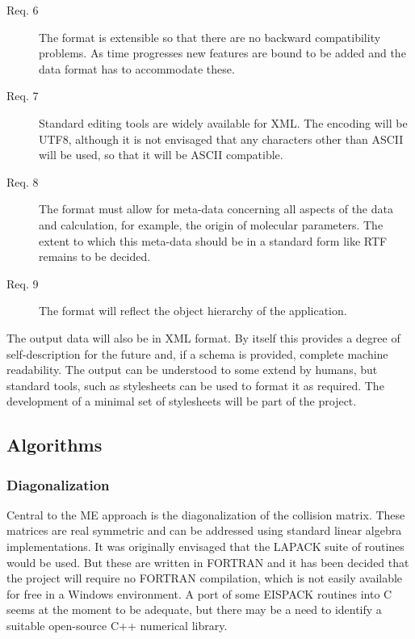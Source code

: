 \begin{description}
\item[Req. 6]{The format is extensible so that there are no backward compatibility problems. As time progresses new features are bound to be added and the data format has to accommodate these.}
\item[Req. 7]{Standard editing tools are widely available for XML. The encoding will be UTF8, although it is not envisaged that any characters other than ASCII will be used, so that it will be ASCII compatible.}
\item[Req. 8]{The format must allow for meta-data concerning all aspects of the data and calculation, for example, the origin of molecular parameters. The extent to which this meta-data should be in a standard form like RTF remains to be decided.}
\item[Req. 9]{The format will reflect the object hierarchy of the application.}
\end{description}

The output data will also be in XML format. By itself this provides a degree of self-description for the future and, if a schema is provided, complete machine readability. The output can be understood to some extend by humans, but standard tools, such as stylesheets can be used to format it as required. The development of a minimal set of stylesheets will be part of the project. 

\subsection{Algorithms}\label{sec:Algorithms}


\subsubsection{Diagonalization}\label{sec:Diagonalization}


Central to the ME approach is the diagonalization of the collision matrix. These matrices are real symmetric and can be addressed using standard linear algebra implementations. It was originally envisaged that the LAPACK suite of routines would be used. But these are written in FORTRAN and it has been decided that the project will require no FORTRAN compilation, which is not easily available for free in a Windows environment. A port of some EISPACK routines into C seems at the moment to be adequate, but there may be a need to identify a suitable open-source C++ numerical library.

